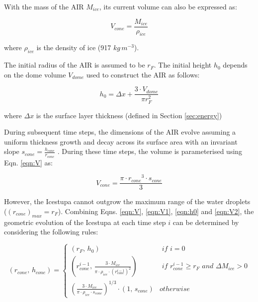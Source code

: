 \documentclass[utf8]{frontiersSCNS} %
\begin{document}
With the mass of the AIR $M_{ice}$, its current volume can also be expressed as:

\begin{equation} V_{cone} =\frac{M_{ice}} {\rho_{ice}} \label{eqn:V1} \end{equation}

where $\rho_{ice}$ is the density of ice (917 $kg\, m^{-3}$).


The initial radius of the AIR is assumed to be $r_F$. The initial height $h_0$ depends on the
dome volume $V_{dome}$ used to construct the AIR as follows:

\begin{equation}
	h_{0} =  \Delta x + \frac{3 \cdot V_{dome}}{\pi r_F^2 }
	\label{eqn:h0}
\end{equation}

where $\Delta x$ is the surface layer thickness (defined in Section \ref{sec:energy})

During subsequent time steps, the dimensions of the AIR evolve assuming a uniform thickness growth and decay
across its surface area with an invariant slope $s_{cone} = \frac{h_{cone}}{r_{cone}}$ .  During these time steps,
the volume is parameterised using Eqn. \ref{eqn:V} as:

\begin{equation} V_{cone} = \frac{\pi \cdot {r_{cone}}^3
		\cdot s_{cone}}{3} \label{eqn:V2} \end{equation}

However, the Icestupa cannot outgrow the maximum range of the water droplets ($(r_{cone})_{max} = r_{F}$).
Combining Eqns. \ref{eqn:V},  \ref{eqn:V1}, \ref{eqn:h0} and \ref{eqn:V2}, the geometric evolution of the
Icestupa at each time step $i$ can be determined by considering the following rules:

\begin{equation} (r_{cone},\, h_{cone}) = \left\{ \begin{array}{ll} (r_F ,\, h_0)                                                                          & \textit{ if } i=0 \\
             (r_{cone}^{i-1},\, \frac{3 \cdot M_{ice}}{\pi \cdot \rho_{ice} \cdot {(r_{cone}^{i-1})}^2}) & \textit{ if }
             r_{cone}^{i-1} \geq r_{F} \textit{ and } \Delta M_{ice} > 0                                                     \\ (\frac{3 \cdot M_{ice}}{\pi \cdot \rho_{ice} \cdot s_{cone}})^{1/3} \cdot (1,\,  s_{cone}) &
             otherwise\end{array} \right.  \label{eqn:A2} \end{equation}
\end{document}
